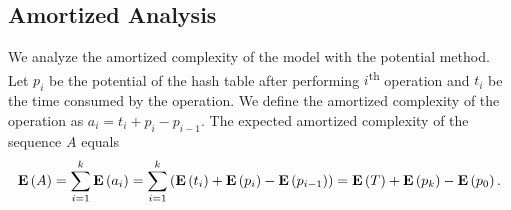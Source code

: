 \subsection{Amortized Analysis}
We analyze the amortized complexity of the model with the potential method. 
Let $p_i$ be the potential of the hash table after performing $i$\textsuperscript{th} operation and $t_i$ be the time consumed by the operation. 
We define the amortized complexity of the operation as $a_i = t_i + p_i - p_{i - 1}$. 
The expected amortized complexity of the sequence $A$ equals
\[
\mathbf{E}\left(A\right) = \sum_{i=1}^{k} \mathbf{E}\left(a_i\right) = \sum_{i = 1}^{k} \left(\mathbf{E}\left(t_i\right) + \mathbf{E}\left(p_i\right) - \mathbf{E}\left(p_{i - 1}\right)\right) = \mathbf{E}\left(T\right) + \mathbf{E}\left(p_k\right) - \mathbf{E}\left(p_0\right).
\]


